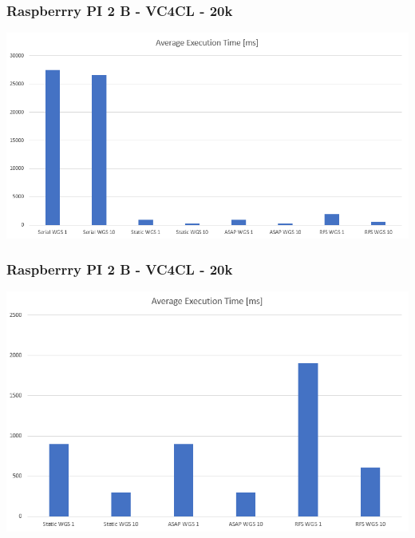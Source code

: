 \documentclass{beamer}
\begin{document}
\begin{frame}
	\frametitle{Raspberrry PI 2 B - VC4CL - 20k}
	\includegraphics[width=.8\textwidth]{res/ResultsVC4CL-20k.PNG}
\end{frame}
\begin{frame}
	\frametitle{Raspberrry PI 2 B - VC4CL - 20k}
	\includegraphics[width=.8\textwidth]{res/ResultsVC4CL-20k_WithoutSerial.PNG}
\end{frame}
\end{document}
